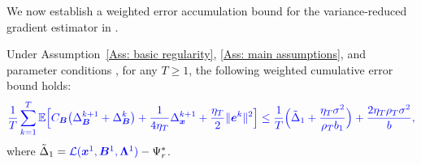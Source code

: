 We now establish a weighted error accumulation bound for the variance-reduced gradient estimator in .
\begin{lemma}
    \label{Lemma: Weighted error accumulation} Under Assumption~\ref{Ass: basic regularity}, \ref{Ass: main assumptions},  and parameter conditions \blue{\eqref{Eq: the parameters conditions in dualhash-storm}--\eqref{Eq: the constants for storm}}, for any $T \geq 1$, the following weighted cumulative error bound holds:
    \begin{align}
        \blue{\frac{1}{T}\sumT\EE\Bigl[C_{\bB}\bigl(\Delta_{\bB}^{k+1}+\Delta_{\bB}^{k}\bigr)+\frac{1}{4\eta_T}\Delta_{\bx}^{k+1}+\frac{\eta_T}{2}\|\be^{k}\|^{2}\Bigr]\leq\frac{1}{T}\Bigl(\tilde{\Delta}_{1}+\frac{\eta_T\sigma^{2}}{\rho_Tb_1}\Bigr)+\frac{2\eta_T\rho_T\sigma^{2}}{b},}
        \label{Eq: weighted error accumulation bound}
    \end{align}
    where $\tilde{\Delta}_{1}={\color{blue}\mathcal{L}(\bm{x}^{1},\bm{B}^{1},\bm{\Lambda}^{1})}-\Psi_r^{*}$.
\end{lemma}
